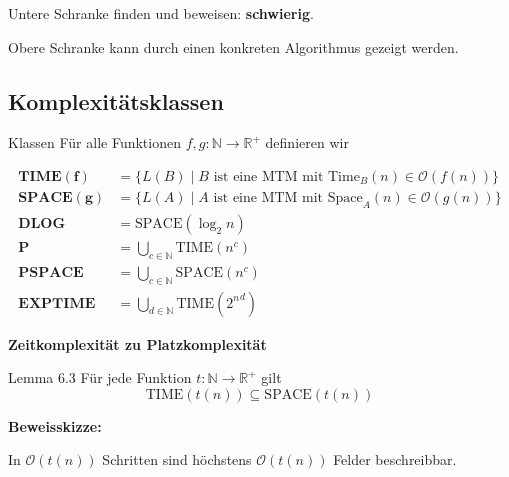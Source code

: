 \documentclass[a4paper, 11pt]{article}
\def\R{\mathbb{R}}
\def\N{\mathbb{N}}
\def\O{\mathcal{O}}
\newcommand\myTitle[1]{{\large \textbf {#1}}}
\begin{document}
                            Untere Schranke finden und beweisen: \textbf{schwierig}.
                        
                            Obere Schranke kann durch einen konkreten Algorithmus gezeigt werden.
                        \subsection{Komplexitätsklassen}
                            \begin{mainbox}{Klassen}
                                Für alle Funktionen $f, g : \N \to \R^+$ definieren wir
                                
                                \begin{align*}
                                    \textbf{TIME}\mathbf{(f)} &= \{L(B) \mid B \text{ ist eine MTM mit Time}_B(n) \in \O(f(n))\}\\
                                    \textbf{SPACE}\mathbf{(g)} &= \{L(A) \mid A \text{ ist eine MTM mit Space}_A(n) \in \O(g(n))\}\\
                                    \textbf{DLOG} &= \text{SPACE}(\log_2 n)\\
                                    \textbf{P} &= \bigcup_{c \in \N}\text{TIME}(n^c)\\
                                    \textbf{PSPACE} &= \bigcup_{c \in \N}\text{SPACE}(n^c)\\
                                    \textbf{EXPTIME} &= \bigcup_{d \in \N}\text{TIME}({2^n}^d)
                                \end{align*}
                            \end{mainbox}
                    
                        
                        \myTitle{Zeitkomplexität zu Platzkomplexität}
                            \begin{mainbox}{Lemma 6.3}
                                Für jede Funktion $t: \N \to \R^+$ gilt
                                $$\text{TIME}(t(n)) \subseteq \text{SPACE}(t(n))$$
                            \end{mainbox}
                            
                            \textbf{Beweisskizze:}
                        
                            In $\O(t(n))$ Schritten sind höchstens $\O(t(n))$ Felder beschreibbar.
                        
\end{document}
